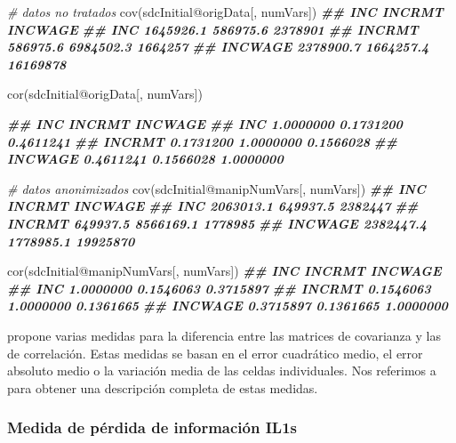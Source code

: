\documentclass[
]{book}
\newenvironment{Shaded}{\begin{snugshade}}{\end{snugshade}}
\newcommand{\CommentTok}[1]{\textcolor[rgb]{0.56,0.35,0.01}{\textit{#1}}}
\newcommand{\DocumentationTok}[1]{\textcolor[rgb]{0.56,0.35,0.01}{\textbf{\textit{#1}}}}
\newcommand{\FunctionTok}[1]{\textcolor[rgb]{0.00,0.00,0.00}{#1}}
\newcommand{\NormalTok}[1]{#1}
\newcommand{\SpecialCharTok}[1]{\textcolor[rgb]{0.00,0.00,0.00}{#1}}
\theoremstyle{definition}
\theoremstyle{definition}
\theoremstyle{definition}
\theoremstyle{definition}
\theoremstyle{remark}
\begin{document}
\begin{Shaded}
\begin{Highlighting}[]
\CommentTok{\# datos no tratados}
\FunctionTok{cov}\NormalTok{(sdcInitial}\SpecialCharTok{@}\NormalTok{origData[, numVars])}
\DocumentationTok{\#\#               INC    INCRMT  INCWAGE}
\DocumentationTok{\#\# INC     1645926.1  586975.6  2378901}
\DocumentationTok{\#\# INCRMT   586975.6 6984502.3  1664257}
\DocumentationTok{\#\# INCWAGE 2378900.7 1664257.4 16169878}

\FunctionTok{cor}\NormalTok{(sdcInitial}\SpecialCharTok{@}\NormalTok{origData[, numVars])}

\DocumentationTok{\#\#               INC    INCRMT   INCWAGE}
\DocumentationTok{\#\# INC     1.0000000 0.1731200 0.4611241}
\DocumentationTok{\#\# INCRMT  0.1731200 1.0000000 0.1566028}
\DocumentationTok{\#\# INCWAGE 0.4611241 0.1566028 1.0000000}

\CommentTok{\# datos anonimizados}
\FunctionTok{cov}\NormalTok{(sdcInitial}\SpecialCharTok{@}\NormalTok{manipNumVars[, numVars])}
\DocumentationTok{\#\#               INC    INCRMT  INCWAGE}
\DocumentationTok{\#\# INC     2063013.1  649937.5  2382447}
\DocumentationTok{\#\# INCRMT   649937.5 8566169.1  1778985}
\DocumentationTok{\#\# INCWAGE 2382447.4 1778985.1 19925870}

\FunctionTok{cor}\NormalTok{(sdcInitial}\SpecialCharTok{@}\NormalTok{manipNumVars[, numVars])}
\DocumentationTok{\#\#               INC    INCRMT   INCWAGE}
\DocumentationTok{\#\# INC     1.0000000 0.1546063 0.3715897}
\DocumentationTok{\#\# INCRMT  0.1546063 1.0000000 0.1361665}
\DocumentationTok{\#\# INCWAGE 0.3715897 0.1361665 1.0000000}
\end{Highlighting}
\end{Shaded}

\citep{domingo-ferrer2001} propone varias medidas para la diferencia entre las matrices de covarianza y las de correlación. Estas medidas se basan en el error cuadrático medio, el error absoluto medio o la variación media de las celdas individuales. Nos referimos a \citep{domingo-ferrer2001} para obtener una descripción completa de estas medidas.

\hypertarget{medida-de-puxe9rdida-de-informaciuxf3n-il1s}{%
\subsubsection{Medida de pérdida de información IL1s}\label{medida-de-puxe9rdida-de-informaciuxf3n-il1s}}
\end{document}
